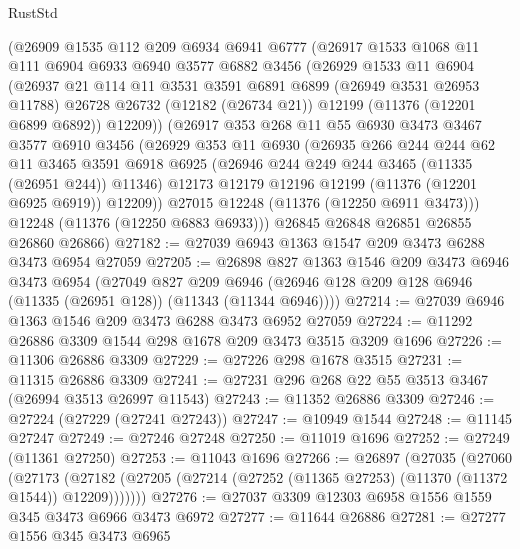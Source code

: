 \begin{lexlean}{RustStd}
\begin{coremodule}
{{{{{{{{{{{{{{{{{{{    (@26909
      @1535
      @112
      @209
      @6934
      @6941
      @6777
      (@26917
        @1533
        @1068
        @11
        @111
        @6904
        @6933
        @6940
        @3577
        @6882
        @3456
        (@26929
          @1533
          @11
          @6904
          (@26937
            @21
            @114
            @11
            @3531
            @3591
            @6891
            @6899
            (@26949 @3531 @26953 @11788)
            @26728
            @26732
            (@12182 (@26734 @21))
            @12199
            (@11376 (@12201 @6899 @6892))
            @12209))
        (@26917
          @353
          @268
          @11
          @55
          @6930
          @3473
          @3467
          @3577
          @6910
          @3456
          (@26929
            @353
            @11
            @6930
            (@26935
              @266
              @244
              @244
              @62
              @11
              @3465
              @3591
              @6918
              @6925
              (@26946 @244 @249 @244 @3465 (@11335 (@26951 @244)) @11346)
              @12173
              @12179
              @12196
              @12199
              (@11376 (@12201 @6925 @6919))
              @12209))
          @27015
          @12248
          (@11376 (@12250 @6911 @3473)))
        @12248
        (@11376 (@12250 @6883 @6933)))
      @26845
      @26848
      @26851
      @26855
      @26860
      @26866)
@27182 := @27039 @6943 @1363 @1547 @209 @3473 @6288 @3473 @6954 @27059
@27205 := @26898
    @827
    @1363
    @1546
    @209
    @3473
    @6946
    @3473
    @6954
    (@27049
      @827
      @209
      @6946
      (@26946 @128 @209 @128 @6946 (@11335 (@26951 @128)) (@11343 (@11344 @6946))))
@27214 := @27039 @6946 @1363 @1546 @209 @3473 @6288 @3473 @6952 @27059
@27224 := @11292 @26886 @3309 @1544 @298 @1678 @209 @3473 @3515 @3209 @1696
@27226 := @11306 @26886 @3309
@27229 := @27226 @298 @1678 @3515
@27231 := @11315 @26886 @3309
@27241 := @27231 @296 @268 @22 @55 @3513 @3467 (@26994 @3513 @26997 @11543)
@27243 := @11352 @26886 @3309
@27246 := @27224 (@27229 (@27241 @27243))
@27247 := @10949 @1544
@27248 := @11145 @27247
@27249 := @27246 @27248
@27250 := @11019 @1696
@27252 := @27249 (@11361 @27250)
@27253 := @11043 @1696
@27266 := @26897
    (@27035
      (@27060
        (@27173
          (@27182 (@27205 (@27214 (@27252 (@11365 @27253) (@11370 (@11372 @1544)) @12209)))))))
@27276 := @27037 @3309 @12303 @6958 @1556 @1559 @345 @3473 @6966 @3473 @6972
@27277 := @11644 @26886
@27281 := @27277 @1556 @345 @3473 @6965
}}}}}}}}}}}}}}}}}}}
\end{coremodule}
\end{lexlean}
